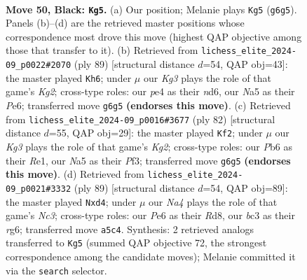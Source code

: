 \documentclass[11pt]{article}
\begin{document}
\clearpage

\begin{figure}[p]\centering
\begin{subfigure}{0.46\textwidth}\centering
\resizebox{\linewidth}{!}{%
\newchessgame
\chessboard[
  setfen={6r1/p7/1pr1p1kp/n4p2/2P1P2R/N1B2P2/P3K1P1/2R5 b - - 0 50},
  showmover=false,
  pgfstyle=straightmove, color=movearrow, markmove={g6-g5}
]}
\caption{}
\end{subfigure}\hfill
\begin{subfigure}{0.46\textwidth}\centering
\resizebox{\linewidth}{!}{%
\newchessgame
\chessboard[
  setfen={8/4rpkr/p2Np3/P1p1n1pP/4P3/1PP5/2K3R1/7R b - - 1 45},
  showmover=false,
  pgfstyle=straightmove, color=movearrow, markmove={g7-h6}
]}
\caption{}
\end{subfigure}
\\[4pt]
\begin{subfigure}{0.46\textwidth}\centering
\resizebox{\linewidth}{!}{%
\newchessgame
\chessboard[
  setfen={8/1p2r3/6rp/p1pPkp2/P1P1p3/1P3P1P/4R1K1/4R3 w - - 1 42},
  showmover=false,
  pgfstyle=straightmove, color=movearrow, markmove={g2-f2}
]}
\caption{}
\end{subfigure}\hfill
\begin{subfigure}{0.46\textwidth}\centering
\resizebox{\linewidth}{!}{%
\newchessgame
\chessboard[
  setfen={3r4/1k1r4/1pn3R1/p5p1/P2P1p2/6PP/1P4K1/3R2B1 b - - 1 45},
  showmover=false,
  pgfstyle=straightmove, color=movearrow, markmove={c6-d4}
]}
\caption{}
\end{subfigure}
\caption{\textbf{Move 50, Black: \texttt{Kg5}.} (a) Our position; Melanie plays \texttt{Kg5} (\texttt{g6g5}). Panels (b)--(d) are the retrieved master positions whose correspondence most drove this move (highest QAP objective among those that transfer to it). (b) Retrieved from \texttt{lichess\_elite\_2024-09\_p0022\#2070} (ply 89) [structural distance $d$=54, QAP obj=43]: the master played \texttt{Kh6}; under $\mu$ our \emph{Kg3} plays the role of that game's \emph{Kg2}; cross-type roles: our \emph{p}e4 as their \emph{n}d6, our \emph{N}a5 as their \emph{P}e6; transferred move \texttt{g6g5} \textbf{(endorses this move)}. (c) Retrieved from \texttt{lichess\_elite\_2024-09\_p0016\#3677} (ply 82) [structural distance $d$=55, QAP obj=29]: the master played \texttt{Kf2}; under $\mu$ our \emph{Kg3} plays the role of that game's \emph{Kg2}; cross-type roles: our \emph{P}b6 as their \emph{R}e1, our \emph{N}a5 as their \emph{P}f3; transferred move \texttt{g6g5} \textbf{(endorses this move)}. (d) Retrieved from \texttt{lichess\_elite\_2024-09\_p0021\#3332} (ply 89) [structural distance $d$=54, QAP obj=89]: the master played \texttt{Nxd4}; under $\mu$ our \emph{Na4} plays the role of that game's \emph{Nc3}; cross-type roles: our \emph{P}e6 as their \emph{R}d8, our \emph{b}c3 as their \emph{r}g6; transferred move \texttt{a5c4}. Synthesis: 2 retrieved analogs transferred to \texttt{Kg5} (summed QAP objective 72, the strongest correspondence among the candidate moves); Melanie committed it via the \texttt{search} selector.}
\label{fig:thought-m99}
\end{figure}
\end{document}
